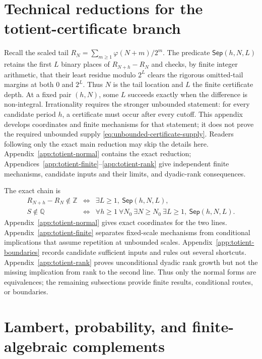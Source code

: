 \documentclass[11pt]{article}
\theoremstyle{definition}
\theoremstyle{remark}
\newcommand{\Z}{\mathbb{Z}}
\newcommand{\Q}{\mathbb{Q}}
\newcommand{\ph}{\varphi}
\begin{document}
\section{Technical reductions for the totient-certificate branch}
\label{app:totient-technical}

Recall the scaled tail
\(R_N=\sum_{m\geq1}\ph(N+m)/2^m\).
The predicate \(\mathsf{Sep}(h,N,L)\) retains the first $L$ binary places of
\(R_{N+h}-R_N\) and checks, by finite integer arithmetic, that their least
residue modulo $2^L$ clears the rigorous omitted-tail margins at both $0$
and $2^L$.  Thus $N$ is the tail location and $L$ the finite certificate
depth.  At a fixed pair \((h,N)\), some $L$ succeeds exactly when the
difference is non-integral.  Irrationality requires the stronger unbounded statement: for
every candidate period \(h\), a certificate must occur after every cutoff.
This appendix develops coordinates and finite mechanisms for that statement;
it does not prove the required unbounded supply
\eqref{eq:unbounded-certificate-supply}.
Readers following only the exact main reduction may skip the details here.
Appendix~\ref{app:totient-normal} contains the exact reduction;
Appendices~\ref{app:totient-finite}--\ref{app:totient-rank} give independent
finite mechanisms, candidate inputs and their limits, and dyadic-rank
consequences.

The exact chain is
\[
\begin{array}{rcl}
 R_{N+h}-R_N\notin\Z
 &\Longleftrightarrow&
 \exists L\geq1,\ \mathsf{Sep}(h,N,L),\\
 S\notin\Q
 &\Longleftrightarrow&
 \forall h\geq1\ \forall N_0\ \exists N\geq N_0\ \exists L\geq1,\
 \mathsf{Sep}(h,N,L).
\end{array}
\]
Appendix~\ref{app:totient-normal} gives exact coordinates for the two lines.
Appendix~\ref{app:totient-finite} separates fixed-scale mechanisms from
conditional implications that assume repetition at unbounded scales.
Appendix~\ref{app:totient-boundaries} records candidate sufficient inputs and
rules out several shortcuts.  Appendix~\ref{app:totient-rank} proves
unconditional dyadic rank growth but not the missing implication from rank to
the second line.  Thus only the normal forms are equivalences; the remaining
subsections provide finite results, conditional routes, or boundaries.

\TotientTechnicalAppendix

\section{Lambert, probability, and finite-algebraic complements}
\label{app:lambert-complements}
\end{document}
